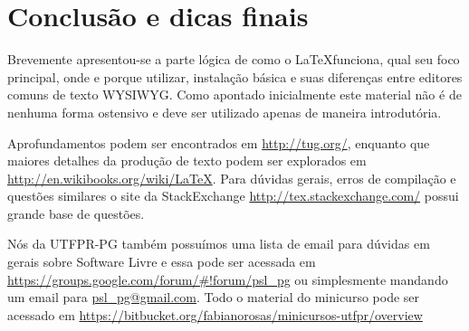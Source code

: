\section{Conclusão e dicas finais}
Brevemente apresentou-se a parte lógica de como o \LaTeX\space funciona, qual seu foco principal, onde e porque utilizar, instalação básica e suas diferenças entre editores comuns de texto WYSIWYG. Como apontado inicialmente este material não é de nenhuma forma ostensivo e deve ser utilizado apenas de maneira introdutória.

Aprofundamentos podem ser encontrados em \url{http://tug.org/}, enquanto que maiores detalhes da produção de texto podem ser explorados em \newline\url{http://en.wikibooks.org/wiki/LaTeX}. Para dúvidas gerais, erros de compilação e questões similares o site \tex\space da \textsf{StackExchange} \url{http://tex.stackexchange.com/} possui grande base de questões.

Nós da UTFPR-PG também possuímos uma lista de email para dúvidas em gerais sobre Software Livre e essa pode ser acessada em \newline\url{https://groups.google.com/forum/#!forum/psl_pg} ou simplesmente mandando um email para \url{psl_pg@gmail.com}. Todo o material do minicurso pode ser acessado em \url{https://bitbucket.org/fabianorosas/minicursos-utfpr/overview}